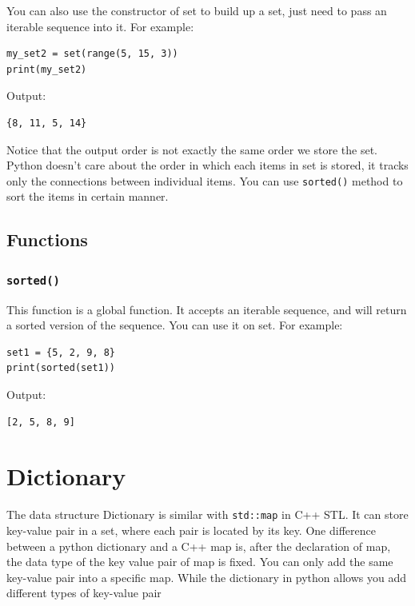 \documentclass[12pt]{book}
\begin{document}
You can also use the constructor of set to build up a set, just need to pass an iterable sequence into it. For example:
\begin{verbatim}
my_set2 = set(range(5, 15, 3))
print(my_set2)
\end{verbatim}
Output:
\begin{verbatim}
{8, 11, 5, 14}
\end{verbatim}
Notice that the output order is not exactly the same order we store the set. Python doesn't care about the order in which each items in set is stored, it tracks only the connections between individual items. You can use \texttt{sorted()} method to sort the items in certain manner.
\subsection{Functions}
\label{sec:org1a644dd}
\subsubsection{\texttt{sorted()}}
\label{sec:org3d5c2c7}
This function is a global function. It accepts an iterable sequence, and will return a sorted version of the sequence. You can use it on set. For example:
\begin{verbatim}
set1 = {5, 2, 9, 8}
print(sorted(set1))
\end{verbatim}
Output:
\begin{verbatim}
[2, 5, 8, 9]
\end{verbatim}

\section{Dictionary}
\label{sec:org6b0f0a7}
The data structure Dictionary is similar with \texttt{std::map} in C++ STL. It can store key-value pair in a set, where each pair is located by its key. One difference between a python dictionary and a C++ map is, after the declaration of map, the data type of the key value pair of map is fixed. You can only add the same key-value pair into a specific map. While the dictionary in python allows you add different types of key-value pair
\end{document}
